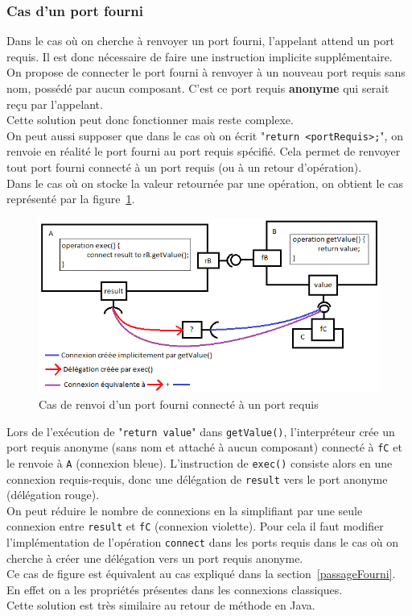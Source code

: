 \documentclass[11pt,a4paper,openany,oneside]{book}
\begin{document}
\subsubsection{Cas d'un port fourni}
Dans le cas où on cherche à renvoyer un port fourni, l'appelant attend un port requis. Il est donc nécessaire de faire une instruction implicite supplémentaire. \\
On propose de connecter le port fourni à renvoyer à un nouveau port requis sans nom, possédé par aucun composant. C'est ce port requis \textbf{anonyme} qui serait reçu par l'appelant.\\
Cette solution peut donc fonctionner mais reste complexe.\\
On peut aussi supposer que dans le cas où on écrit "\texttt{return <portRequis>;}", on renvoie en réalité le port fourni au port requis spécifié. Cela permet de renvoyer tout port fourni connecté à un port requis (ou à un retour d'opération).\\
Dans le cas où on stocke la valeur retournée par une opération, on obtient le cas représenté par la figure~\ref{renvoiFourni}.\\
\begin{figure}[H]
\centering
\includegraphics[scale=0.7, keepaspectratio=true]{renvoiFourni.png}
\caption{Cas de renvoi d'un port fourni connecté à un port requis}
\label{renvoiFourni}
\end{figure}
Lors de l'exécution de "\texttt{return value}" dans \texttt{getValue()}, l'interpréteur crée un port requis anonyme (sans nom et attaché à aucun composant) connecté à \texttt{fC} et le renvoie à \texttt{A} (connexion bleue). L'instruction de \texttt{exec()} consiste alors en une connexion requis-requis, donc une délégation de \texttt{result} vers le port anonyme (délégation rouge).\\
On peut réduire le nombre de connexions en la simplifiant par une seule connexion entre \texttt{result} et \texttt{fC} (connexion violette). Pour cela il faut modifier l'implémentation de l'opération \texttt{connect} dans les ports requis dans le cas où on cherche à créer une délégation vers un port requis anonyme.\\
Ce cas de figure est équivalent au cas expliqué dans la section~\ref{passageFourni}. En effet on a les propriétés présentes dans les connexions classiques.\\
Cette solution est très similaire au retour de méthode en Java.
\end{document}
